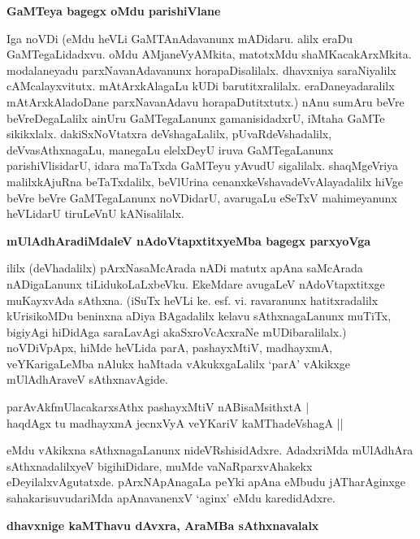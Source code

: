{\bigskip
\noindent
{\large\bf GaMTeya bagegx oMdu parishiVlane}}\label{page170}
\medskip

\noindent
Iga noVDi (eMdu heVLi GaMTAnAdavanunx mADidaru. alilx eraDu GaMTegaLidadxvu. oMdu AMjaneVyAMkita, matotxMdu shaMKacakArxMkita. modalaneyadu parxNavanAdavanunx horapaDisalilalx. dhavxniya saraNiyalilx cAMcalayxvitutx. mAtArxkAlagaLu kUDi barutitxralilalx. eraDaneyadaralilx mAtArxkAla\-doDane parxNavanAdavu horapaDutitxtutx.) nAnu sumAru beVre beVreDegaLalilx ainUru GaMTegaLanunx gamanisi\-dadxrU, iMtaha GaMTe sikikxlalx. dakiSxNoVtatxra deVshagaLalilx, pUvaRdeVshadalilx, deVvasAthxnagaLu, mane\-gaLu elelxDeyU iruva GaMTegaLanunx parishiVlisidarU, idara maTaTxda GaMTeyu yAvudU sigalilalx. shaqMgeVriya malilxkAjuRna beTaTxdalilx, beVlUrina cenanxkeVshavadeVvAlayadalilx hiVge beVre beVre GaMTe\-gaLanunx noVDidarU, avarugaLu eSeTxV mahimeyanunx heVLidarU tiruLeVnU kANisalilalx.

\eject

{\bigskip
\noindent
{\large\bf mUlAdhAradiMdaleV nAdoVtapxtitxyeMba bagegx parxyoVga}}\label{page171}
\medskip

\noindent
ililx (deVhadalilx) pArxNasaMcArada nADi matutx apAna saMcArada nADigaLanunx tiLidukoLaLx\-beVku. EkeMdare avugaLeV nAdoVtapxtitxge muKayxvAda sAthxna. (iSuTx heVLi ke. esf. vi. ravaranunx hatitxra\-dalilx kUrisikoMDu beninxna aDiya BAgadalilx kelavu sAthxnagaLanunx muTiTx, bigiyAgi hiDidAga saraLa\-vAgi akaSxroVcAcxraNe mUDibaralilalx.) noVDiVpApx, hiMde heVLida parA, pashayxMtiV, madhayxmA, veYKari\-gaLeMba nAlukx haMtada vAkukxgaLalilx `parA' vAkikxge mUlAdhAraveV sAthxnavAgide.

\begin{shloka}
parAvAkfmUlacakarxsAthx pashayxMtiV nABisaMsithxtA |\\\label{171}
haqdAgx tu madhayxmA jecnxVyA veYKariV kaMThadeVshagA ||
\end{shloka}

\noindent
eMdu vAkikxna sAthxnagaLanunx nideVRshisidAdxre. AdadxriMda mUlAdhAra sAthxnadalilxyeV bigihiDi\-dare, muMde vaNaRparxvAhakekx eDeyilalxvAgutatxde. pArxNApAnagaLa peYki apAna eMbudu jATharAginxge saha\-karisuvudariMda apAnavanenxV `aginx' eMdu karedidAdxre.

{\bigskip
\noindent
{\large\bf dhavxnige kaMThavu dAvxra, AraMBa sAthxnavalalx}}\label{page171}
\medskip

